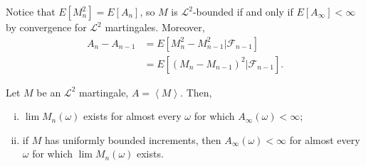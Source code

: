 \documentclass[10pt]{mypackage}
\begin{document}
Notice that $E\left[ M_n^2 \right] = E\left[ A_n \right]$, so $M$ is $\mathcal{L}^2$-bounded if and only if $E\left[ A_{\infty} \right] < \infty$ by convergence for $\mathcal{L}^2$ martingales. Moreover,
\begin{align*}
  A_n-A_{n-1} &= E\left[ M_n^2 - M_{n-1}^2|\mathcal{F}_{n-1} \right]\\
              &= E\left[ \left( M_n-M_{n-1} \right)^2|\mathcal{F}_{n-1} \right].
\end{align*}
\begin{theorem}
  Let $M$ be an $\mathcal{L}^2$ martingale, $A = \left\langle M \right\rangle$. Then,
  \begin{enumerate}[(i)]
    \item $\lim M_n(\omega)$ exists for almost every $\omega$ for which $A_{\infty}(\omega) < \infty$;
    \item if $M$ has uniformly bounded increments, then $A_{\infty}(\omega) < \infty$ for almost every $\omega$ for which $\lim M_n(\omega)$ exists.
  \end{enumerate}
\end{theorem}
\end{document}
